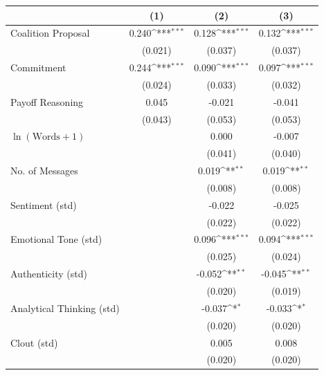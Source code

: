 \renewcommand{\arraystretch}{0.85}
\def\sym#1{\ifmmode^{#1}\else\(^{#1}\)\fi}
\begin{tabular}{lccc}
\toprule
                &\multicolumn{1}{c}{(1)}         &\multicolumn{1}{c}{(2)}         &\multicolumn{1}{c}{(3)}         \\
\midrule
Coalition Proposal&    0.240\sym{***}&    0.128\sym{***}&    0.132\sym{***}\\
                &  (0.021)         &  (0.037)         &  (0.037)         \\
Commitment      &    0.244\sym{***}&    0.090\sym{***}&    0.097\sym{***}\\
                &  (0.024)         &  (0.033)         &  (0.032)         \\
Payoff Reasoning&    0.045         &   -0.021         &   -0.041         \\
                &  (0.043)         &  (0.053)         &  (0.053)         \\
$\ln(\text{Words} + 1)$&                  &    0.000         &   -0.007         \\
                &                  &  (0.041)         &  (0.040)         \\
No. of Messages &                  &    0.019\sym{**} &    0.019\sym{**} \\
                &                  &  (0.008)         &  (0.008)         \\
Sentiment (std) &                  &   -0.022         &   -0.025         \\
                &                  &  (0.022)         &  (0.022)         \\
Emotional Tone (std)&                  &    0.096\sym{***}&    0.094\sym{***}\\
                &                  &  (0.025)         &  (0.024)         \\
Authenticity (std)&                  &   -0.052\sym{**} &   -0.045\sym{**} \\
                &                  &  (0.020)         &  (0.019)         \\
Analytical Thinking (std)&                  &   -0.037\sym{*}  &   -0.033\sym{*}  \\
                &                  &  (0.020)         &  (0.020)         \\
Clout (std)     &                  &    0.005         &    0.008         \\
                &                  &  (0.020)         &  (0.020)         \\

\end{tabular}
